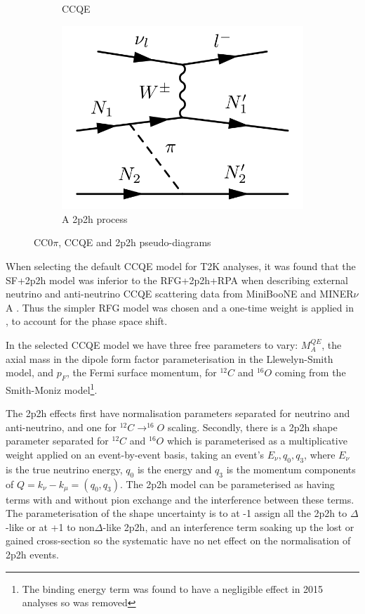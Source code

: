 \begin{figure}[h]
\begin{subfigure}[t]{0.32\textwidth}
		\caption{CCQE}
	\end{subfigure}
	\begin{subfigure}[t]{0.32\textwidth}
		\includegraphics[width=\textwidth, trim={0mm 0mm 0mm 0mm}, clip,page=1]{figures/niwg/diagrams/2p2h_possibly}
		\caption{A 2p2h process}
	\end{subfigure}
	\caption{CC0$\pi$, CCQE and 2p2h pseudo-diagrams}
	\label{fig:cc0pi_diag}
\end{figure}

When selecting the default CCQE model for T2K analyses, it was found\cite{ccqe_tuning} that the SF+2p2h model was inferior to the RFG+2p2h+RPA when describing external neutrino and anti-neutrino CCQE scattering data from MiniBooNE\cite{miniboone_nu_ccqe, miniboone_nubar_ccqe} and MINER$\nu$A \cite{minerva_nu_ccqe, minerva_nubar_ccqe}. Thus the simpler RFG model was chosen and a one-time weight is applied in \pmu, \cosmu to account for the phase space shift.

In the selected CCQE model we have three free parameters to vary: $M_A^{QE}$, the axial mass in the dipole form factor parameterisation in the Llewelyn-Smith model, and $p_F$, the Fermi surface momentum, for $^{12}C$ and $^{16}O$ coming from the Smith-Moniz model\footnote{The binding energy term was found to have a negligible effect in 2015 analyses so was removed}.

The 2p2h effects first have normalisation parameters separated for neutrino and anti-neutrino, and one for $^{12}C\rightarrow^{16}O$ scaling. Secondly, there is a 2p2h shape parameter separated for $^{12}C$ and $^{16}O$ which is parameterised as a multiplicative weight applied on an event-by-event basis, taking an event's $E_\nu, q_0, q_3$, where $E_\nu$ is the true neutrino energy, $q_0$ is the energy and $q_3$ is the momentum components of $Q = k_\nu - k_\mu = (q_0, q_3)$. The 2p2h model can be parameterised as having terms with and without pion exchange and the interference between these terms. The parameterisation of the shape uncertainty is to at -1 assign all the 2p2h to $\Delta$-like or at +1 to non$\Delta$-like 2p2h, and an interference term soaking up the lost or gained cross-section so the systematic have no net effect on the normalisation of 2p2h events.

